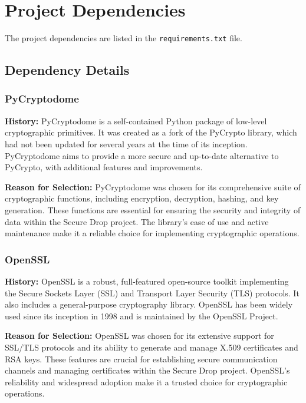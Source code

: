 \documentclass[12pt]{article}
\begin{document}
\newpage

\section{Project Dependencies}
The project dependencies are listed in the \texttt{requirements.txt} file.



\subsection{Dependency Details}

\subsubsection{PyCryptodome}
\textbf{History:} PyCryptodome is a self-contained Python package of low-level cryptographic primitives. It was created as a fork of the PyCrypto library, which had not been updated for several years at the time of its inception. PyCryptodome aims to provide a more secure and up-to-date alternative to PyCrypto, with additional features and improvements.

\textbf{Reason for Selection:} PyCryptodome was chosen for its comprehensive suite of cryptographic functions, including encryption, decryption, hashing, and key generation. These functions are essential for ensuring the security and integrity of data within the Secure Drop project. The library's ease of use and active maintenance make it a reliable choice for implementing cryptographic operations.

\subsubsection{OpenSSL}
\textbf{History:} OpenSSL is a robust, full-featured open-source toolkit implementing the Secure Sockets Layer (SSL) and Transport Layer Security (TLS) protocols. It also includes a general-purpose cryptography library. OpenSSL has been widely used since its inception in 1998 and is maintained by the OpenSSL Project.

\textbf{Reason for Selection:} OpenSSL was chosen for its extensive support for SSL/TLS protocols and its ability to generate and manage X.509 certificates and RSA keys. These features are crucial for establishing secure communication channels and managing certificates within the Secure Drop project. OpenSSL's reliability and widespread adoption make it a trusted choice for cryptographic operations.
\end{document}
